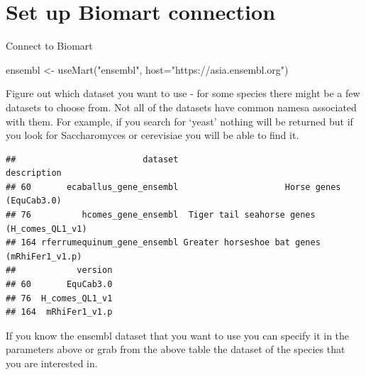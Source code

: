 \documentclass[
]{book}
\newenvironment{Shaded}{\begin{snugshade}}{\end{snugshade}}
\newcommand{\AttributeTok}[1]{\textcolor[rgb]{0.77,0.63,0.00}{#1}}
\newcommand{\CommentTok}[1]{\textcolor[rgb]{0.56,0.35,0.01}{\textit{#1}}}
\newcommand{\ConstantTok}[1]{\textcolor[rgb]{0.00,0.00,0.00}{#1}}
\newcommand{\FunctionTok}[1]{\textcolor[rgb]{0.00,0.00,0.00}{#1}}
\newcommand{\NormalTok}[1]{#1}
\newcommand{\OtherTok}[1]{\textcolor[rgb]{0.56,0.35,0.01}{#1}}
\newcommand{\SpecialCharTok}[1]{\textcolor[rgb]{0.00,0.00,0.00}{#1}}
\newcommand{\StringTok}[1]{\textcolor[rgb]{0.31,0.60,0.02}{#1}}
\begin{document}
\hypertarget{set-up-biomart-connection}{%
\section{Set up Biomart connection}\label{set-up-biomart-connection}}

Connect to Biomart

\begin{Shaded}
\begin{Highlighting}[]
\NormalTok{ensembl }\OtherTok{\textless{}{-}} \FunctionTok{useMart}\NormalTok{(}\StringTok{"ensembl"}\NormalTok{, }\AttributeTok{host=}\StringTok{"https://asia.ensembl.org"}\NormalTok{)}
\end{Highlighting}
\end{Shaded}

Figure out which dataset you want to use - for some species there might be a few datasets to choose from. Not all of the datasets have common namesa associated with them. For example, if you search for `yeast' nothing will be returned but if you look for Saccharomyces or cerevisiae you will be able to find it.

\begin{Shaded}
\end{Shaded}

\begin{verbatim}
##                         dataset                                 description
## 60       ecaballus_gene_ensembl                     Horse genes (EquCab3.0)
## 76          hcomes_gene_ensembl  Tiger tail seahorse genes (H_comes_QL1_v1)
## 164 rferrumequinum_gene_ensembl Greater horseshoe bat genes (mRhiFer1_v1.p)
##            version
## 60       EquCab3.0
## 76  H_comes_QL1_v1
## 164  mRhiFer1_v1.p
\end{verbatim}

If you know the ensembl dataset that you want to use you can specify it in the parameters above or grab from the above table the dataset of the species that you are interested in.
\end{document}
